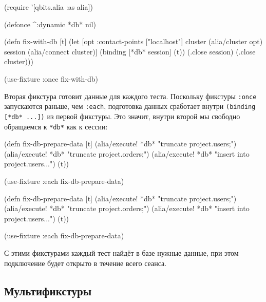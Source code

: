 \else

\begin{english}
  \begin{clojure}
(require '[qbits.alia :as alia])

(defonce ^:dynamic *db* nil)

(defn fix-with-db [t]
  (let [opt {:contact-points ["localhost"]}
        cluster (alia/cluster opt)
        session (alia/connect cluster)]
    (binding [*db* session]
      (t))
    (.close session)
    (.close cluster)))

(use-fixture :once fix-with-db)
  \end{clojure}
\end{english}

\fi

Вторая фикстура готовит данные для каждого теста. Поскольку фикстуры
\verb|:once| запускаются раньше, чем \verb|:each|, подготовка данных сработает
внутри \verb|(binding [*db* ...])| из первой фикстуры. Это значит, внутри второй
мы свободно обращаемся к \verb|*db*| как к сессии:


\ifnarrow

\begin{english}
  \begin{clojure}
(defn fix-db-prepare-data [t]
  (alia/execute! *db*
    "truncate project.users;")
  (alia/execute! *db*
    "truncate project.orders;")
  (alia/execute! *db*
    "insert into project.users...")
  (t))

(use-fixture :each fix-db-prepare-data)
  \end{clojure}
\end{english}

\else

\begin{english}
  \begin{clojure}
(defn fix-db-prepare-data [t]
  (alia/execute! *db* "truncate project.users;")
  (alia/execute! *db* "truncate project.orders;")
  (alia/execute! *db* "insert into project.users...")
  (t))

(use-fixture :each fix-db-prepare-data)
  \end{clojure}
\end{english}

\fi

С этими фикстурами каждый тест найдёт в базе нужные данные, при этом подключение
будет открыто в течение всего сеанса.

\subsection{Мультификстуры}

